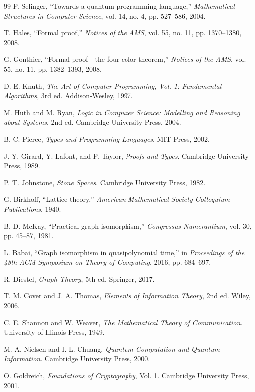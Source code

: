 \documentclass[11pt]{article}
\begin{document}
\begin{thebibliography}{99}
 P. Selinger, ``Towards a quantum programming language,'' \emph{Mathematical Structures in Computer Science}, vol. 14, no. 4, pp. 527--586, 2004.

 T. Hales, ``Formal proof,'' \emph{Notices of the AMS}, vol. 55, no. 11, pp. 1370--1380, 2008.

 G. Gonthier, ``Formal proof---the four-color theorem,'' \emph{Notices of the AMS}, vol. 55, no. 11, pp. 1382--1393, 2008.

 D. E. Knuth, \emph{The Art of Computer Programming, Vol. 1: Fundamental Algorithms}, 3rd ed. Addison-Wesley, 1997.

 M. Huth and M. Ryan, \emph{Logic in Computer Science: Modelling and Reasoning about Systems}, 2nd ed. Cambridge University Press, 2004.

 B. C. Pierce, \emph{Types and Programming Languages}. MIT Press, 2002.

 J.-Y. Girard, Y. Lafont, and P. Taylor, \emph{Proofs and Types}. Cambridge University Press, 1989.

 P. T. Johnstone, \emph{Stone Spaces}. Cambridge University Press, 1982.

 G. Birkhoff, ``Lattice theory,'' \emph{American Mathematical Society Colloquium Publications}, 1940.

 B. D. McKay, ``Practical graph isomorphism,'' \emph{Congressus Numerantium}, vol. 30, pp. 45--87, 1981.

 L. Babai, ``Graph isomorphism in quasipolynomial time,'' in \emph{Proceedings of the 48th ACM Symposium on Theory of Computing}, 2016, pp. 684--697.

 R. Diestel, \emph{Graph Theory}, 5th ed. Springer, 2017.

 T. M. Cover and J. A. Thomas, \emph{Elements of Information Theory}, 2nd ed. Wiley, 2006.

 C. E. Shannon and W. Weaver, \emph{The Mathematical Theory of Communication}. University of Illinois Press, 1949.

 M. A. Nielsen and I. L. Chuang, \emph{Quantum Computation and Quantum Information}. Cambridge University Press, 2000.

 O. Goldreich, \emph{Foundations of Cryptography}, Vol. 1. Cambridge University Press, 2001.


\end{thebibliography}
\end{document}
